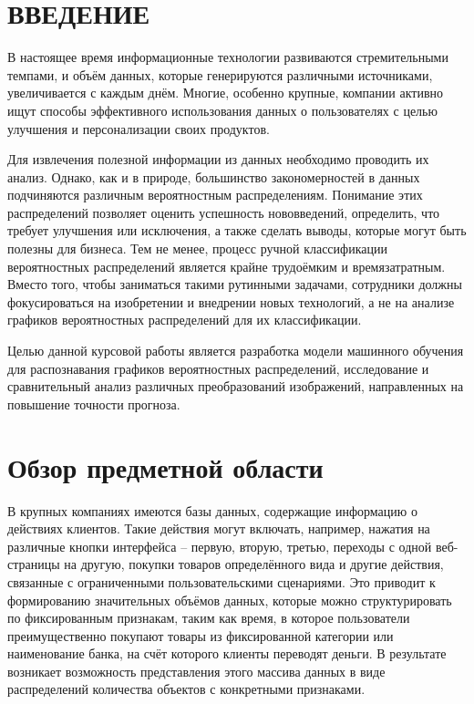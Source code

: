 \documentclass[14pt, russian]{scrartcl}
\newcommand{\anonsection}[1]{\cleardoublepage
\phantomsection %
\addcontentsline{toc}{section}{\protect\numberline{}#1}
\section*{#1}\vspace*{2.5ex} %
}
\begin{document}
\setlength{\tabcolsep}{3pt}
\newpage
\setcounter{page}{2}
\newpage
\renewcommand\contentsname{\hfill{\normalfont{СОДЕРЖАНИЕ}}\hfill}  %
\tableofcontents
\newpage
\anonsection{ВВЕДЕНИЕ}  %
В настоящее время информационные технологии развиваются стремительными темпами, и объём данных, которые генерируются различными источниками, увеличивается с каждым днём. Многие, особенно крупные, компании активно ищут способы эффективного использования данных о пользователях с целью улучшения и персонализации своих продуктов.

Для извлечения полезной информации из данных необходимо проводить их анализ. Однако, как и в природе, большинство закономерностей в данных подчиняются различным вероятностным распределениям. Понимание этих распределений позволяет оценить успешность нововведений, определить, что требует улучшения или исключения, а также сделать выводы, которые могут быть полезны для бизнеса. Тем не менее, процесс ручной классификации вероятностных распределений является крайне трудоёмким и времязатратным. Вместо того, чтобы заниматься такими рутинными задачами, сотрудники должны фокусироваться на изобретении и внедрении новых технологий, а не на анализе графиков вероятностных распределений для их классификации. 

Целью данной курсовой работы является разработка модели машинного обучения для распознавания графиков вероятностных распределений, исследование и сравнительный анализ различных преобразований изображений, направленных на повышение точности прогноза.

\section{Обзор предметной области}
В крупных компаниях имеются базы данных, содержащие информацию о действиях клиентов. Такие действия могут включать, например, нажатия на различные кнопки интерфейса -- первую, вторую, третью, переходы с одной веб-страницы на другую, покупки товаров определённого вида и другие действия, связанные с ограниченными пользовательскими сценариями. Это приводит к формированию значительных объёмов данных, которые можно структурировать по фиксированным признакам, таким как время, в которое пользователи преимущественно покупают товары из фиксированной категории или наименование банка, на счёт которого клиенты переводят деньги. В результате возникает возможность представления этого массива данных в виде распределений количества объектов с конкретными признаками. 
\end{document}
